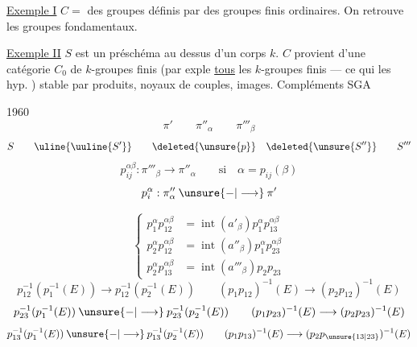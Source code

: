 \uline{Exemple I} $C=$  des groupes définis par des
groupes finis ordinaires. On retrouve les groupes fondamentaux.

\uline{Exemple II} $S$ est un préschéma au dessus d'un corps $k$.
$C$ provient d'une catégorie $C_0$ de $k$-groupes finis
(par exple \uline{tous} les $k$-groupes finis --- ce qui
  les hyp. )
stable par produits, noyaux de couples, images.
Compléments SGA

1960
\[
\pi'\qquad \pi''_\alpha\qquad \pi'''_\beta
\]
\[
S\qquad \uline{\uuline{S'}}\qquad
\deleted{\unsure{p}}\quad \deleted{\unsure{S''}}\qquad S'''
\]
\[
p_{ij}^{\alpha\beta}:\pi'''_\beta\longrightarrow\pi''_\alpha
\qquad\text{si}\quad\alpha=p_{ij}(\beta)
\]
\[
p_i^\alpha:\pi''_\alpha\mathbin{\unsure{-|\longrightarrow}}\pi'
\]

\[
\left\{\begin{aligned}
p_1^\alpha p_{12}^{\alpha\beta}
 &=\operatorname{int}(a'_\beta)p_1^\alpha p_{13}^{\alpha\beta}\\
p_2^\alpha p_{12}^{\alpha\beta}
 &=\operatorname{int}(a''_\beta)p_1^\alpha p_{23}^{\alpha\beta}\\
p_2^\alpha p_{13}^{\alpha\beta}
 &=\operatorname{int}(a'''_\beta)p_2p_{23}
\end{aligned}\right.
\]
\[
p_{12}^{-1}(p_1^{-1}(E))\longrightarrow p_{12}^{-1}(p_2^{-1}(E))
\qquad
(p_1p_{12})^{-1}(E)\longrightarrow(p_2p_{12})^{-1}(E)
\]
\[
p_{23}^{-1}(p_1^{-1}(E))\mathbin{\unsure{-|\longrightarrow}}
p_{23}^{-1}(p_2^{-1}(E))
\qquad
(p_1p_{23})^{-1}(E)\longrightarrow(p_2p_{23})^{-1}(E)
\]
\[
p_{13}^{-1}(p_1^{-1}(E))\mathbin{\unsure{-|\longrightarrow}}
p_{13}^{-1}(p_2^{-1}(E))
\qquad
(p_1p_{13})^{-1}(E)\longrightarrow(p_2p_{\unsure{13|23}})^{-1}(E)
\]

